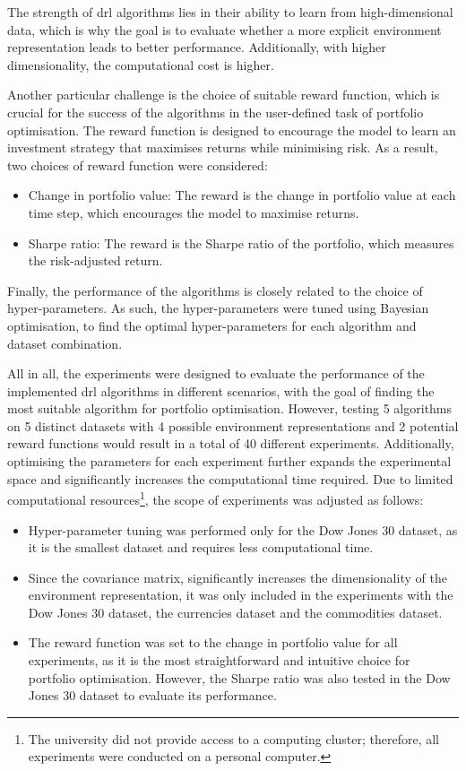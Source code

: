 The strength of \acrshort{drl} algorithms lies in their ability to learn from high-dimensional data, which is why the goal is to evaluate whether a more explicit environment representation leads to better performance. Additionally, with higher dimensionality, the computational cost is higher.

Another particular challenge is the choice of suitable reward function, which is crucial for the success of the algorithms in the user-defined task of portfolio optimisation. The reward function is designed to encourage the model to learn an investment strategy that maximises returns while minimising risk. As a result, two choices of reward function were considered:
\begin{itemize}
    \item Change in portfolio value: The reward is the change in portfolio value at each time step, which encourages the model to maximise returns.
    \item Sharpe ratio: The reward is the Sharpe ratio of the portfolio, which measures the risk-adjusted return.
\end{itemize}

Finally, the performance of the algorithms is closely related to the choice of hyper-parameters. As such, the hyper-parameters were tuned using Bayesian optimisation, to find the optimal hyper-parameters for each algorithm and dataset combination.

All in all, the experiments were designed to evaluate the performance of the implemented \acrshort{drl} algorithms in different scenarios, with the goal of finding the most suitable algorithm for portfolio optimisation. However, testing 5 algorithms on 5 distinct datasets with 4 possible environment representations and 2 potential reward functions would result in a total of 40 different experiments. Additionally, optimising the parameters for each experiment further expands the experimental space and significantly increases the computational time required. Due to limited computational resources\footnote{The university did not provide access to a computing cluster; therefore, all experiments were conducted on a personal computer.}, the scope of experiments was adjusted as follows:
\begin{itemize}
    \item Hyper-parameter tuning was performed only for the Dow Jones 30 dataset, as it is the smallest dataset and requires less computational time.
    \item Since the covariance matrix, significantly increases the dimensionality of the environment representation, it was only included in the experiments with the Dow Jones 30 dataset, the currencies dataset and the commodities dataset.
    \item The reward function was set to the change in portfolio value for all experiments, as it is the most straightforward and intuitive choice for portfolio optimisation. However, the Sharpe ratio was also tested in the Dow Jones 30 dataset to evaluate its performance.
\end{itemize}

